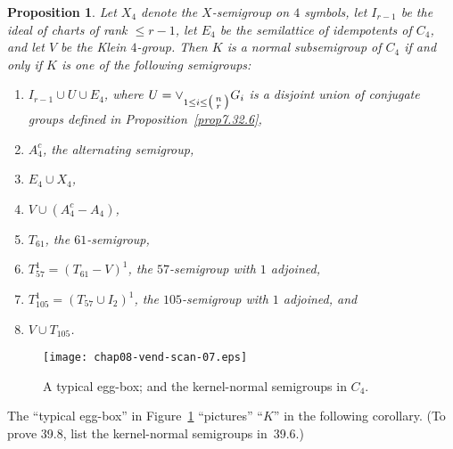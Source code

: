 \documentclass{surv-l}
\numberwithin{equation}{section}
\numberwithin{table}{section}
\numberwithin{figure}{section}
\theoremstyle{plain}
\newtheorem{proposition}[equation]{Proposition}
\theoremstyle{definition}
\begin{document}
\setcounter{equation}{5}
\begin{proposition}\label{prop8.39.6}
Let $X_{4}$ denote the $X$-semigroup on
$4$ symbols, let $I_{r-1}$ be the ideal of
charts of rank $\leq r-1$, let $E_{4}$ be the semilattice of
idempotents of $C_{4}$, and let $V$ be the Klein $4$-group. Then $K$
is a normal subsemigroup of $C_{4}$ if and only if $K$ is one of
the following semigroups:
\begin{enumerate}
\item[(1)] $I_{r-1}\cup U\cup E_{4}$, where $U=\vee_{1\leq
i\leq\big(\kern0.5pt\begin{smallmatrix}{n}\\
{r}\end{smallmatrix}\kern0.5pt\big)}G_{i}$ is a disjoint union of
conjugate groups defined in \emph{Proposition~\ref{prop7.32.6}},

\item[(2)] $A_{4}^{c}$, the alternating semigroup,

\item[(3)] $E_{4}\cup X_{4}$,

\item[(4)] $V\cup(A_{4}^{c}-A_{4})$,

\item[(5)] $T_{61}$, the $61$-semigroup,

\item[(6)] $T_{57}^{1}=(T_{61}-V)^{1}$, the $57$-semigroup with $1$ adjoined,

\item[(7)] $T_{105}^{1}=(T_{57}\cup I_{2})^{1}$, the $105$-semigroup with $1$ adjoined, and

\item[(8)] $V\cup T_{105}$.
\end{enumerate}
\end{proposition}

\setcounter{figure}{6}
\begin{figure}[!h]
\texttt{[image: chap08-vend-scan-07.eps]}
\caption{A typical egg-box; and the kernel-normal semigroups in $C_{4}$.}\label{fig8.39.7}
\end{figure}


The ``typical egg-box'' in Figure~\ref{fig8.39.7} ``pictures''
``$K$'' in the following corollary. (To prove 39.8, list the
kernel-normal semigroups in~39.6.)
\end{document}
